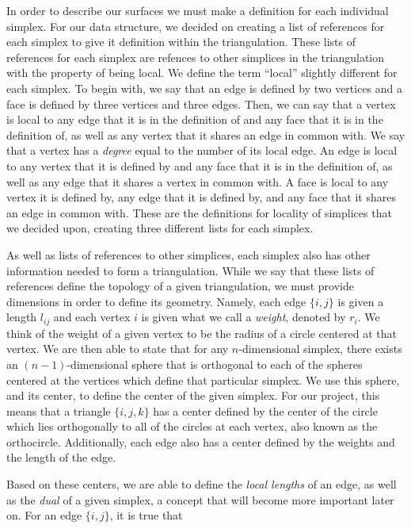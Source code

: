 \documentclass[12pt]{article}
\begin{document}
\noindent In order to describe our surfaces we must make a definition for each individual simplex. For our data structure, we decided on creating a list of references for each simplex to give it definition within the triangulation. These lists of references for each simplex are refences to other simplices in the triangulation with the property of being local. We define the term ``local'' slightly different for each simplex. To begin with, we say that an edge is defined by two vertices and a face is defined by three vertices and three edges. Then, we can say that a vertex is local to any edge that it is in the definition of and any face that it is in the definition of, as well as any vertex that it shares an edge in common with. We say that a vertex has a \textit{degree} equal to the number of its local edge. An edge is local to any vertex that it is defined by and any face that it is in the definition of, as well as any edge that it shares a vertex in common with. A face is local to any vertex it is defined by, any edge that it is defined by, and any face that it shares an edge in common with. These are the definitions for locality of simplices that we decided upon, creating three different lists for each simplex. \newline

\noindent As well as lists of references to other simplices, each simplex also has other information needed to form a triangulation. While we say that these lists of references define the topology of a given triangulation, we must provide dimensions in order to define its geometry. Namely, each edge $\{i, j\}$ is given a length $l_{ij}$ and each vertex $i$ is given what we call a \textit{weight}, denoted by $r_i$. We think of the weight of a given vertex to be the radius of a circle centered at that vertex. We are then able to state that for any $\textit{n}$-dimensional simplex, there exists an $(n-1)$-dimensional sphere that is orthogonal to each of the spheres centered at the vertices which define that particular simplex\cite{Dave}. We use this sphere, and its center, to define the center of the given simplex. For our project, this means that a triangle $\{i, j, k\}$ has a center defined by the center of the circle which lies orthogonally to all of the circles at each vertex, also known as the orthocircle. Additionally, each edge also has a center defined by the weights and the length of the edge. \newline

\noindent Based on these centers, we are able to define the \textit{local lengths} of an edge, as well as the \textit{dual} of a given simplex, a concept that will become more important later on. For an edge $\{i, j\}$, it is true that 
\end{document}
